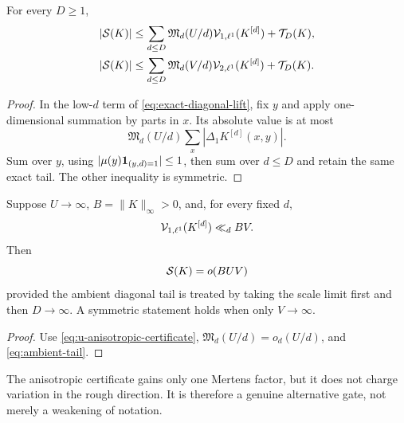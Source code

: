 \begin{proposition}
\label{prop:anisotropic-certificate}
For every \(D\ge1\),
\begin{align}
 |\mathcal S(K)|
 &\le
 \sum_{d\le D}
 \mathfrak M_d(U/d)\mathcal V_{1,\ell^1}(K^{[d]})
 +\mathcal T_D(K),
\label{eq:u-anisotropic-certificate}\\
 |\mathcal S(K)|
 &\le
 \sum_{d\le D}
 \mathfrak M_d(V/d)\mathcal V_{2,\ell^1}(K^{[d]})
 +\mathcal T_D(K).
\label{eq:v-anisotropic-certificate}
\end{align}
\end{proposition}

\begin{proof}
In the low-\(d\) term of \eqref{eq:exact-diagonal-lift}, fix \(y\) and
apply one-dimensional summation by parts in \(x\).  Its absolute value is
at most
\[
 \mathfrak M_d(U/d)\sum_x|\Delta_1K^{[d]}(x,y)|.
\]
Sum over \(y\), using
\(|\mu(y)\mathbf 1_{(y,d)=1}|\le1\), then sum over \(d\le D\) and retain the
same exact tail.  The other inequality is symmetric.
\end{proof}

\begin{corollary}
\label{cor:one-regular-direction}
Suppose \(U\to\infty\), \(B=\|K\|_\infty>0\), and, for every fixed \(d\),
\[
 \mathcal V_{1,\ell^1}(K^{[d]})\ll_d BV.
\]
Then
\[
 \mathcal S(K)=o(BUV)
\]
provided the ambient diagonal tail is treated by taking the scale limit
first and then \(D\to\infty\).  A symmetric statement holds when only
\(V\to\infty\).
\end{corollary}

\begin{proof}
Use \eqref{eq:u-anisotropic-certificate},
\(\mathfrak M_d(U/d)=o_d(U/d)\), and
\eqref{eq:ambient-tail}.
\end{proof}

\begin{remark}
The anisotropic certificate gains only one Mertens factor, but it does not
charge variation in the rough direction.  It is therefore a genuine
alternative gate, not merely a weakening of notation.
\end{remark}
